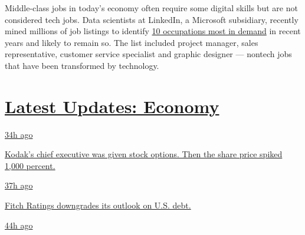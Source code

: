 Middle-class jobs in today's economy often require some digital skills
but are not considered tech jobs. Data scientists at LinkedIn, a
Microsoft subsidiary, recently mined millions of job listings to
identify
\href{https://blogs.microsoft.com/blog/2020/06/30/microsoft-launches-initiative-to-help-25-million-people-worldwide-acquire-the-digital-skills-needed-in-a-covid-19-economy/}{10
occupations most in demand} in recent years and likely to remain so. The
list included project manager, sales representative, customer service
specialist and graphic designer --- nontech jobs that have been
transformed by technology.

\hypertarget{latest-updates-economy}{%
\section{\texorpdfstring{\href{https://www.nytimes.com/live/2020/07/31/business/stock-market-today-coronavirus?action=click\&pgtype=Article\&state=default\&region=MAIN_CONTENT_1\&context=storylines_live_updates}{Latest
Updates:
Economy}}{Latest Updates: Economy}}\label{latest-updates-economy}}

\href{https://www.nytimes.com/live/2020/07/31/business/stock-market-today-coronavirus?action=click\&pgtype=Article\&state=default\&region=MAIN_CONTENT_1\&context=storylines_live_updates\#kodaks-chief-executive-was-given-stock-options-then-the-share-price-spiked-1000-percent}{34h
ago}

\href{https://www.nytimes.com/live/2020/07/31/business/stock-market-today-coronavirus?action=click\&pgtype=Article\&state=default\&region=MAIN_CONTENT_1\&context=storylines_live_updates\#kodaks-chief-executive-was-given-stock-options-then-the-share-price-spiked-1000-percent}{Kodak's
chief executive was given stock options. Then the share price spiked
1,000 percent.}

\href{https://www.nytimes.com/live/2020/07/31/business/stock-market-today-coronavirus?action=click\&pgtype=Article\&state=default\&region=MAIN_CONTENT_1\&context=storylines_live_updates\#fitch-ratings-downgrades-its-outlook-on-us-debt}{37h
ago}

\href{https://www.nytimes.com/live/2020/07/31/business/stock-market-today-coronavirus?action=click\&pgtype=Article\&state=default\&region=MAIN_CONTENT_1\&context=storylines_live_updates\#fitch-ratings-downgrades-its-outlook-on-us-debt}{Fitch
Ratings downgrades its outlook on U.S. debt.}

\href{https://www.nytimes.com/live/2020/07/31/business/stock-market-today-coronavirus?action=click\&pgtype=Article\&state=default\&region=MAIN_CONTENT_1\&context=storylines_live_updates\#us-sanctions-more-chinese-officials-over-human-rights-violations-as-tensions-flare}{44h
ago}

